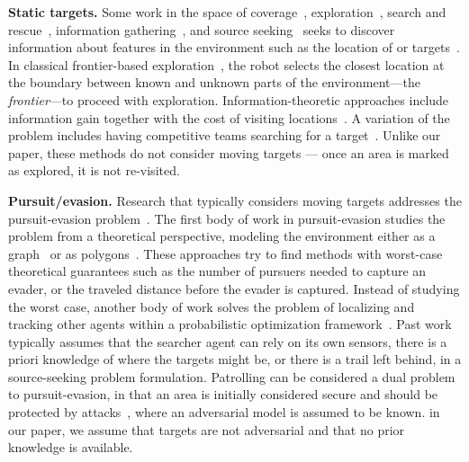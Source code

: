 \textbf{Static targets.} Some work in the space of coverage~\cite{galceran2013survey}, exploration~\cite{quattrini2020exploration}, search and rescue~\cite{drew2021multi}, information gathering~\cite{bai2021information}, and source seeking~\cite{hajieghrary2017information,marjovi2010multi} seeks to discover information about features in the environment such as the location of or targets~\cite{rouvcek2020darpa}. In classical frontier-based exploration~\cite{yamauchi1998frontier}, the robot selects the closest location at the boundary between known and unknown parts of the environment---the \emph{frontier}---to proceed with exploration. Information-theoretic approaches include information gain together with the cost of visiting locations~\cite{burgard2005coordinated,basilico2011exploration}. A variation of the problem includes having competitive teams searching for a target~\cite{otte2018competitive}. Unlike our paper, these methods do not consider moving targets --- once an area is marked as explored, it is not re-visited. 

\textbf{Pursuit/evasion.} Research that typically considers moving targets addresses the pursuit-evasion problem~\cite{chung2011search}.
The first body of work in pursuit-evasion studies the problem from a theoretical perspective, modeling the environment either as a graph~\cite{isler2006randomized,borie2011algorithms,kehagias2009graph} or as polygons~\cite{isler2005randomized,guibas1999visibility,quattrini2018search,stiffler2017complete}. These approaches try to find methods with worst-case theoretical guarantees  such as the number of pursuers needed to capture an evader, or the traveled distance before the evader is captured. Instead of studying the worst case, another body of work solves the problem of localizing and tracking other agents within a probabilistic optimization framework~\cite{li2021bayesian,chung2011analysis,lau2006probabilistic,matzliach2020cooperative}. Past work typically assumes that the searcher agent can rely on its own sensors, there is  a priori knowledge of where the targets might be, or there is a trail left behind, in a source-seeking problem formulation. Patrolling can be considered a dual problem to pursuit-evasion, in that an area is initially considered secure and should be protected by attacks~\cite{basilico2022recent}, where an adversarial model is assumed to be known.  in our paper, we assume that targets are not adversarial and that no prior knowledge is available. 
%



